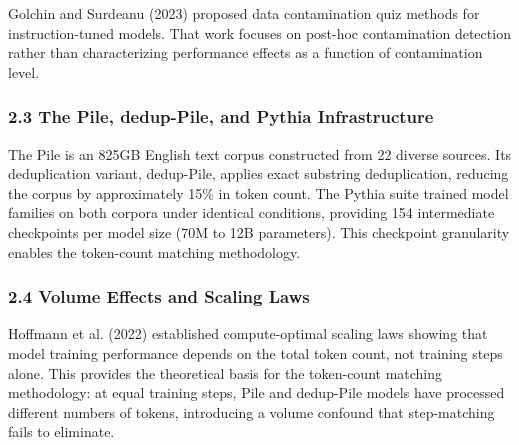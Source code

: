 Golchin and Surdeanu (2023) proposed data contamination quiz methods for instruction-tuned models. That work focuses on post-hoc contamination detection rather than characterizing performance effects as a function of contamination level.

\subsubsection{2.3 The Pile, dedup-Pile, and Pythia Infrastructure}

The Pile \citep{Gao2020Pile} is an 825GB English text corpus constructed from 22 diverse sources. Its deduplication variant, dedup-Pile, applies exact substring deduplication, reducing the corpus by approximately 15\% in token count. The Pythia suite \citep{Biderman2023Pythia} trained model families on both corpora under identical conditions, providing 154 intermediate checkpoints per model size (70M to 12B parameters). This checkpoint granularity enables the token-count matching methodology.

\subsubsection{2.4 Volume Effects and Scaling Laws}

Hoffmann et al. (2022) established compute-optimal scaling laws showing that model training performance depends on the total token count, not training steps alone. This provides the theoretical basis for the token-count matching methodology: at equal training steps, Pile and dedup-Pile models have processed different numbers of tokens, introducing a volume confound that step-matching fails to eliminate.

